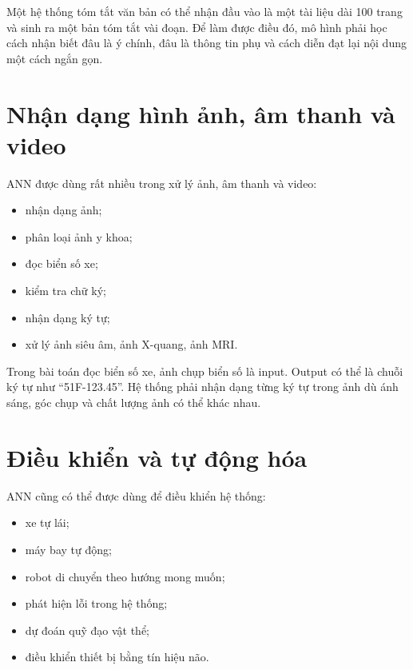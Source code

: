 \documentclass[12pt,a4paper]{report}
\begin{document}
\begin{vidu}
Một hệ thống tóm tắt văn bản có thể nhận đầu vào là một tài liệu dài 100 trang và sinh ra một bản tóm tắt vài đoạn. Để làm được điều đó, mô hình phải học cách nhận biết đâu là ý chính, đâu là thông tin phụ và cách diễn đạt lại nội dung một cách ngắn gọn.
\end{vidu}

\section{Nhận dạng hình ảnh, âm thanh và video}

ANN được dùng rất nhiều trong xử lý ảnh, âm thanh và video:

\begin{itemize}
    \item nhận dạng ảnh;
    \item phân loại ảnh y khoa;
    \item đọc biển số xe;
    \item kiểm tra chữ ký;
    \item nhận dạng ký tự;
    \item xử lý ảnh siêu âm, ảnh X-quang, ảnh MRI.
\end{itemize}

\begin{vidu}
Trong bài toán đọc biển số xe, ảnh chụp biển số là input. Output có thể là chuỗi ký tự như ``51F-123.45''. Hệ thống phải nhận dạng từng ký tự trong ảnh dù ánh sáng, góc chụp và chất lượng ảnh có thể khác nhau.
\end{vidu}

\section{Điều khiển và tự động hóa}

ANN cũng có thể được dùng để điều khiển hệ thống:

\begin{itemize}
    \item xe tự lái;
    \item máy bay tự động;
    \item robot di chuyển theo hướng mong muốn;
    \item phát hiện lỗi trong hệ thống;
    \item dự đoán quỹ đạo vật thể;
    \item điều khiển thiết bị bằng tín hiệu não.
\end{itemize}
\end{document}
